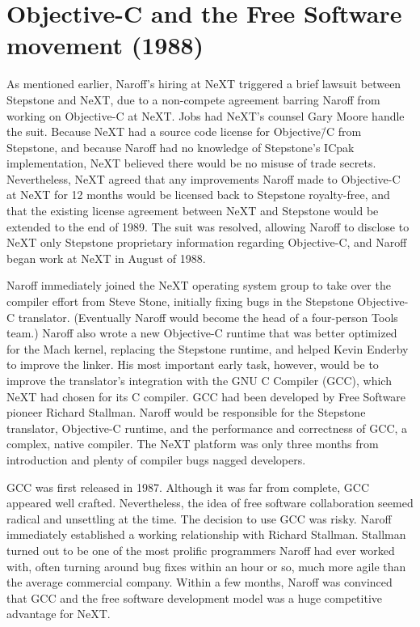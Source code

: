 \documentclass[acmsmall]{acmart}\settopmatter{}
\begin{document}
\section{Objective-C and the Free Software movement (1988)}
\label{sec-freesoftware1988}
As mentioned earlier, Naroff's hiring at NeXT triggered a brief lawsuit between Stepstone and NeXT, due to a non-compete agreement barring Naroff from working on Objective-C at NeXT. Jobs had NeXT's counsel Gary Moore handle the suit. Because NeXT had a source code license for Objective\=/C from Stepstone, and because Naroff had no knowledge of Stepstone's ICpak implementation, NeXT believed there would be no misuse of trade secrets. Nevertheless, NeXT agreed that any improvements Naroff made to Objective-C at NeXT for 12 months would be licensed back to Stepstone royalty-free, and that the existing license agreement between NeXT and Stepstone would be extended to the end of 1989. The suit was resolved, allowing Naroff to disclose to NeXT only Stepstone proprietary information regarding Objective-C, and Naroff began work at NeXT in August of 1988. 

Naroff immediately joined the NeXT operating system group to take over the compiler effort from Steve Stone, initially fixing bugs in the Stepstone Objective-C translator. (Eventually Naroff would become the head of a four-person Tools team.) Naroff also wrote a new Objective-C runtime that was better optimized for the Mach kernel, replacing the Stepstone runtime, and helped Kevin Enderby to improve the linker. His most important early task, however, would be to improve the translator's integration with the GNU C Compiler (GCC), which NeXT had chosen for its C compiler. GCC had been developed by Free Software pioneer Richard Stallman. Naroff would be responsible for the Stepstone translator, Objective-C runtime, and the performance and correctness of GCC, a complex, native compiler. The NeXT platform was only three months from introduction and plenty of compiler bugs nagged developers.

GCC was first released in 1987. Although it was far from complete, GCC appeared well crafted. Nevertheless, the idea of free software collaboration seemed radical and unsettling at the time. The decision to use GCC was risky. Naroff immediately established a working relationship with Richard Stallman. Stallman turned out to be one of the most prolific programmers Naroff had ever worked with, often turning around bug fixes within an hour or so, much more agile than the average commercial company. Within a few months, Naroff was convinced that GCC and the free software development model was a huge competitive advantage for NeXT.
\end{document}
